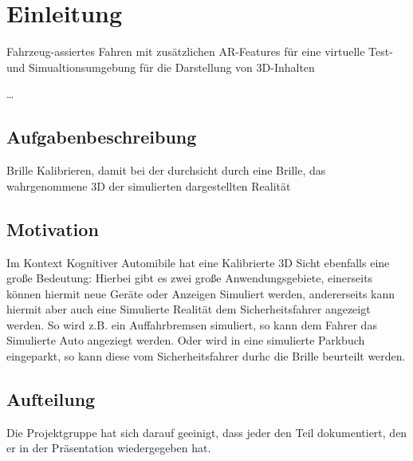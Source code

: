\section{Einleitung}

Fahrzeug-assiertes Fahren mit zusätzlichen AR-Features für eine virtuelle Test- und Simualtionsumgebung für die Darstellung von 3D-Inhalten 

\ldots 

\subsection{Aufgabenbeschreibung}
Brille Kalibrieren, damit bei der durchsicht durch eine Brille, das wahrgenommene 3D der simulierten dargestellten Realität

\subsection{Motivation}
Im Kontext Kognitiver Automibile hat eine Kalibrierte 3D Sicht ebenfalls eine große Bedeutung: Hierbei gibt es zwei große Anwendungsgebiete, einerseits können hiermit neue Geräte oder Anzeigen Simuliert werden, andererseits kann hiermit aber auch eine Simulierte Realität dem Sicherheitsfahrer angezeigt werden. So wird z.B. ein Auffahrbremsen simuliert, so kann dem Fahrer das Simulierte Auto angeziegt werden. Oder wird in eine simulierte Parkbuch eingeparkt, so kann diese vom Sicherheitsfahrer durhc die Brille beurteilt werden.

\subsection{Aufteilung}
Die Projektgruppe hat sich darauf geeinigt, dass jeder den Teil dokumentiert, den er in der Präsentation wiedergegeben hat.